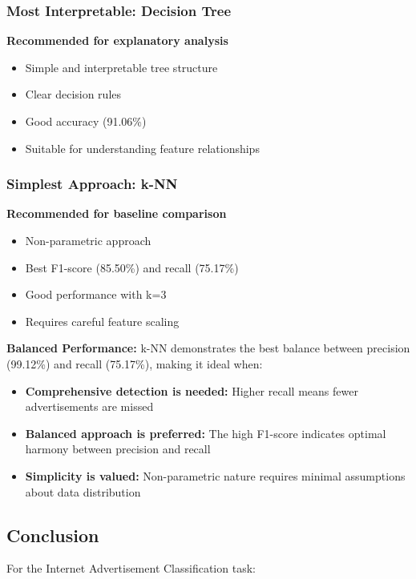 \subsubsection{Most Interpretable: Decision Tree}
\textbf{Recommended for explanatory analysis}
\begin{itemize}
    \item Simple and interpretable tree structure
    \item Clear decision rules
    \item Good accuracy (91.06\%)
    \item Suitable for understanding feature relationships
\end{itemize}

\subsubsection{Simplest Approach: k-NN}
\textbf{Recommended for baseline comparison}
\begin{itemize}
    \item Non-parametric approach
    \item Best F1-score (85.50\%) and recall (75.17\%)
    \item Good performance with k=3
    \item Requires careful feature scaling
\end{itemize}

\textbf{Balanced Performance:} k-NN demonstrates the best balance between precision (99.12\%) and recall (75.17\%), making it ideal when:
\begin{itemize}
    \item \textbf{Comprehensive detection is needed:} Higher recall means fewer advertisements are missed
    \item \textbf{Balanced approach is preferred:} The high F1-score indicates optimal harmony between precision and recall
    \item \textbf{Simplicity is valued:} Non-parametric nature requires minimal assumptions about data distribution
\end{itemize}

\subsection{Conclusion}

For the Internet Advertisement Classification task:

